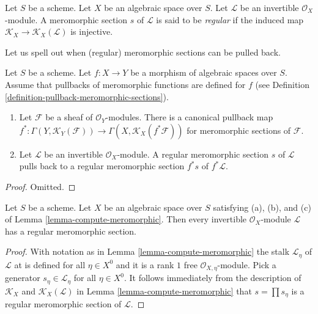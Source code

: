 \begin{definition}
\label{definition-regular-meromorphic-section}
Let $S$ be a scheme.
Let $X$ be an algebraic space over $S$.
Let $\mathcal{L}$ be an invertible $\mathcal{O}_X$-module.
A meromorphic section $s$ of $\mathcal{L}$ is said to be {\it regular}
if the induced map $\mathcal{K}_X \to \mathcal{K}_X(\mathcal{L})$
is injective.
\end{definition}

\noindent
Let us spell out when (regular) meromorphic sections can be pulled back.

\begin{lemma}
\label{lemma-meromorphic-sections-pullback}
Let $S$ be a scheme.
Let $f : X \to Y$ be a morphism of algebraic spaces over $S$.
Assume that pullbacks of meromorphic functions are defined
for $f$ (see
Definition \ref{definition-pullback-meromorphic-sections}).
\begin{enumerate}
\item Let $\mathcal{F}$ be a sheaf of $\mathcal{O}_Y$-modules.
There is a canonical pullback map
$f^* : \Gamma(Y, \mathcal{K}_Y(\mathcal{F})) \to
\Gamma(X, \mathcal{K}_X(f^*\mathcal{F}))$
for meromorphic sections of $\mathcal{F}$.
\item Let $\mathcal{L}$ be an invertible $\mathcal{O}_X$-module.
A regular meromorphic section $s$ of $\mathcal{L}$ pulls back
to a regular meromorphic section $f^*s$ of $f^*\mathcal{L}$.
\end{enumerate}
\end{lemma}

\begin{proof}
Omitted.
\end{proof}

\begin{lemma}
\label{lemma-regular-meromorphic-section-exists}
Let $S$ be a scheme. Let $X$ be an algebraic space over $S$
satisfying (a), (b), and (c) of
Lemma \ref{lemma-compute-meromorphic}.
Then every invertible $\mathcal{O}_X$-module $\mathcal{L}$ has
a regular meromorphic section.
\end{lemma}

\begin{proof}
With notation as in Lemma \ref{lemma-compute-meromorphic}
the stalk $\mathcal{L}_\eta$ of $\mathcal{L}$ at is defined for all
$\eta \in X^0$ and it is a rank $1$ free $\mathcal{O}_{X, \eta}$-module.
Pick a generator $s_\eta \in \mathcal{L}_\eta$ for all $\eta \in X^0$.
It follows immediately from the description of
$\mathcal{K}_X$ and $\mathcal{K}_X(\mathcal{L})$
in Lemma \ref{lemma-compute-meromorphic}
that $s = \prod s_\eta$ is a regular meromorphic section of $\mathcal{L}$.
\end{proof}












